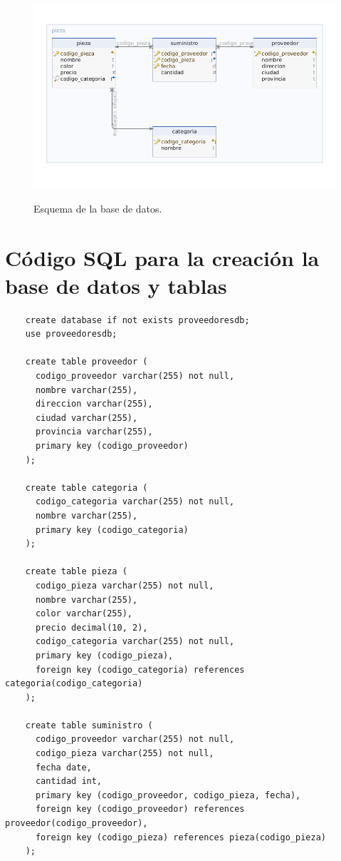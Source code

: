 \documentclass{article}
\begin{document}
\begin{figure}[ht]
    \centering
    {
        \includegraphics[width=\linewidth]{schema.png} %
    }
    \caption{Esquema de la base de datos.}
\end{figure}

\newpage

\section*{Código SQL para la creación la base de datos y tablas}

\begin{lstlisting}
    create database if not exists proveedoresdb;
    use proveedoresdb;
    
    create table proveedor (
      codigo_proveedor varchar(255) not null,
      nombre varchar(255),
      direccion varchar(255),
      ciudad varchar(255),
      provincia varchar(255),
      primary key (codigo_proveedor)
    );
    
    create table categoria (
      codigo_categoria varchar(255) not null,
      nombre varchar(255),
      primary key (codigo_categoria)
    );
    
    create table pieza (
      codigo_pieza varchar(255) not null,
      nombre varchar(255),
      color varchar(255),
      precio decimal(10, 2),
      codigo_categoria varchar(255) not null,
      primary key (codigo_pieza),
      foreign key (codigo_categoria) references categoria(codigo_categoria)
    );
    
    create table suministro (
      codigo_proveedor varchar(255) not null,
      codigo_pieza varchar(255) not null,
      fecha date,
      cantidad int,
      primary key (codigo_proveedor, codigo_pieza, fecha),
      foreign key (codigo_proveedor) references proveedor(codigo_proveedor),
      foreign key (codigo_pieza) references pieza(codigo_pieza)
    );
    
\end{lstlisting}
\end{document}
